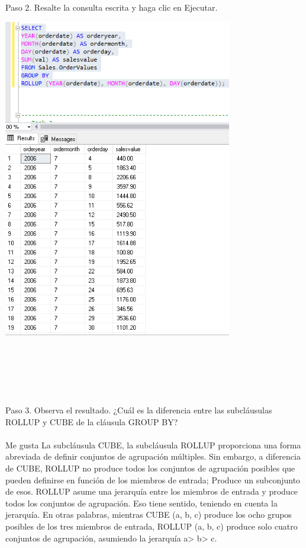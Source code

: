 \begin{flushleft}
Paso 2. Resalte la consulta escrita y haga clic en Ejecutar.
\begin{center}
	\includegraphics[width=10cm]{./Imagenes/6img6} 
	\end{center}
\textbf{}\\
\textbf{}\\
\textbf{}\\
\textbf{}\\
\textbf{}\\
Paso 3. Observa el resultado. ¿Cuál es la diferencia entre las subcláusulas ROLLUP y CUBE de la cláusula GROUP BY? 
\textbf{}\\
\textbf{}\\
Me gusta La subcláusula CUBE, la subcláusula ROLLUP proporciona una forma abreviada de definir conjuntos de agrupación múltiples. Sin embargo, a diferencia de CUBE, ROLLUP no produce todos los conjuntos de agrupación posibles que pueden definirse en función de los miembros de entrada; Produce un subconjunto de esos. ROLLUP asume una jerarquía entre los miembros de entrada y produce todos los conjuntos de agrupación. Eso tiene sentido, teniendo en cuenta la jerarquía. En otras palabras, mientras CUBE (a, b, c) produce los ocho grupos posibles de los tres miembros de entrada, ROLLUP (a, b, c) produce solo cuatro conjuntos de agrupación, asumiendo la jerarquía a> b> c.

\end{flushleft}
